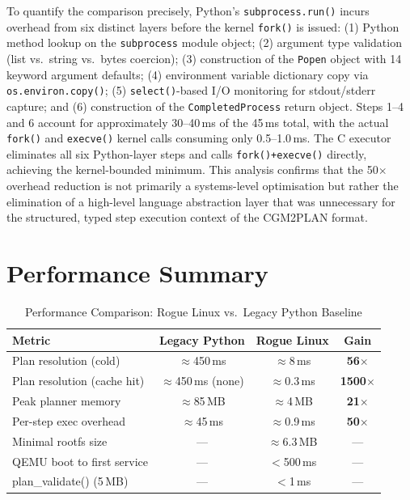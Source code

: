 \documentclass[12pt,a4paper]{report}
\begin{document}
To quantify the comparison precisely, Python's \texttt{subprocess.run()} incurs
overhead from six distinct layers before the kernel \texttt{fork()} is issued:
(1) Python method lookup on the \texttt{subprocess} module object; (2) argument
type validation (list vs.\ string vs.\ bytes coercion); (3) construction of the
\texttt{Popen} object with 14 keyword argument defaults; (4) environment variable
dictionary copy via \texttt{os.environ.copy()}; (5) \texttt{select()}-based I/O
monitoring for stdout/stderr capture; and (6) construction of the
\texttt{CompletedProcess} return object. Steps 1--4 and 6 account for
approximately 30--40\,ms of the 45\,ms total, with the actual \texttt{fork()}
and \texttt{execve()} kernel calls consuming only 0.5--1.0\,ms. The C executor
eliminates all six Python-layer steps and calls \texttt{fork()+execve()} directly,
achieving the kernel-bounded minimum. This analysis confirms that the 50$\times$
overhead reduction is not primarily a systems-level optimisation but rather the
elimination of a high-level language abstraction layer that was unnecessary for
the structured, typed step execution context of the CGM2PLAN format.

\section{Performance Summary}

\begin{table}[H]
\centering
\caption{Performance Comparison: Rogue Linux vs.\ Legacy Python Baseline}
\renewcommand{\arraystretch}{1.25}
\begin{tabularx}{\linewidth}{X c c c}
\toprule
\textbf{Metric} & \textbf{Legacy Python} & \textbf{Rogue Linux} & \textbf{Gain}\\
\midrule
Plan resolution (cold)      & $\approx$450\,ms        & $\approx$8\,ms   & \textbf{56$\times$}\\
Plan resolution (cache hit) & $\approx$450\,ms (none) & $\approx$0.3\,ms & \textbf{1500$\times$}\\
Peak planner memory         & $\approx$85\,MB         & $\approx$4\,MB   & \textbf{21$\times$}\\
Per-step exec overhead      & $\approx$45\,ms         & $\approx$0.9\,ms & \textbf{50$\times$}\\
Minimal rootfs size         & ---                      & $\approx$6.3\,MB & ---\\
QEMU boot to first service  & ---                      & $<$500\,ms       & ---\\
plan\_validate() (5\,MB)    & ---                      & $<$1\,ms         & ---\\
\bottomrule
\end{tabularx}
\end{table}
\end{document}
